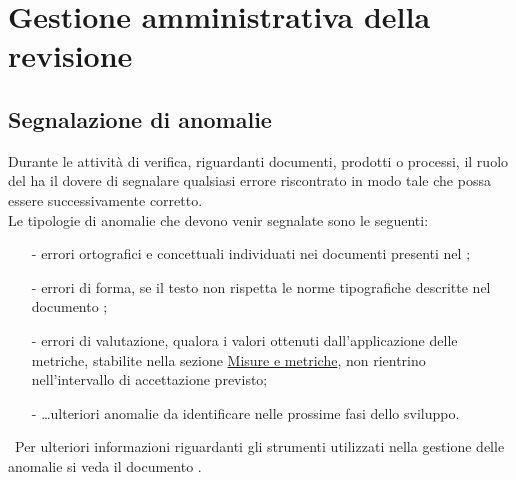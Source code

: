 \documentclass[a4paper, titlepage]{article}
\begin{document}
\newpage
\section{Gestione amministrativa della revisione}

\subsection{Segnalazione di anomalie}
Durante le attività di verifica, riguardanti documenti, prodotti o processi, il ruolo del  ha il dovere di segnalare qualsiasi errore riscontrato in modo tale che possa essere successivamente corretto. 
\\Le tipologie di anomalie che devono venir segnalate sono le seguenti:
\begin{itemize}
\item[-]errori ortografici e concettuali individuati nei documenti presenti nel ;
\item[-]errori di forma, se il testo non rispetta le norme tipografiche descritte nel documento ;
\item[-]errori di valutazione, qualora i valori ottenuti dall'applicazione delle metriche, stabilite nella sezione \hyperref[sec:metr]{Misure e metriche}, non rientrino nell'intervallo di accettazione previsto;
\item[-] \dots  ulteriori anomalie da identificare nelle prossime fasi dello sviluppo.
\end{itemize} 
\ 
\newline Per ulteriori informazioni riguardanti gli strumenti utilizzati nella gestione delle anomalie si veda il documento \NdPdoc.

\newpage
\appendix
\end{document}

